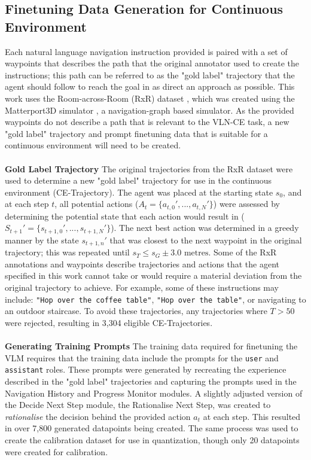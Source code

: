 \documentclass{svproc}
\begin{document}
\subsection{Finetuning Data Generation for Continuous Environment}
    Each natural language navigation instruction provided is paired with a set of waypoints that describes the path that the original annotator used to create the instructions; this path can be referred to as the "gold label" trajectory that the agent should follow to reach the goal in as direct an approach as possible. This work uses the Room-across-Room (RxR) dataset \cite{rxr}, which was created using the Matterport3D simulator \cite{Matterport3D}, a navigation-graph based simulator. As the provided waypoints do not describe a path that is relevant to the VLN-CE task, a new "gold label" trajectory and prompt finetuning data that is suitable for a continuous environment will need to be created.
    \\ \\
    \textbf{Gold Label Trajectory}  The original trajectories from the RxR dataset were used to determine a new "gold label" trajectory for use in the continuous environment (CE-Trajectory). The agent was placed at the starting state $s_0$, and at each step $t$, all potential actions ($A_t = \{a_{t,0}', ..., a_{t,N}'\}$) were assessed by determining the potential state that each action would result in ($S_{t+1}' = \{s_{t+1,0}', ..., s_{t+1,N}'\}$). The next best action was determined in a greedy manner by the state $s_{t+1, n}'$ that was closest to the next waypoint in the original trajectory; this was repeated until $s_T \leq s_G \pm 3.0 \text{ metres}$. Some of the RxR annotations and waypoints describe trajectories and actions that the agent specified in this work cannot take or would require a material deviation from the original trajectory to achieve. For example, some of these instructions may include: \texttt{"Hop over the coffee table"}, \texttt{"Hop over the table"}, or navigating to an outdoor staircase. To avoid these trajectories, any trajectories where $T > 50$ were rejected, resulting in 3,304 eligible CE-Trajectories.
    \\ \\
    \textbf{Generating Training Prompts}  The training data required for finetuning the VLM requires that the training data include the prompts for the \texttt{user} and \texttt{assistant} roles. These prompts were generated by recreating the experience described in the "gold label" trajectories and capturing the prompts used in the Navigation History and Progress Monitor modules. A slightly adjusted version of the Decide Next Step module, the Rationalise Next Step, was created to \textit{rationalise} the decision behind the provided action $a_t$ at each step. This resulted in over 7,800 generated datapoints being created. The same process was used to create the calibration dataset for use in quantization, though only 20 datapoints were created for calibration.
\end{document}

